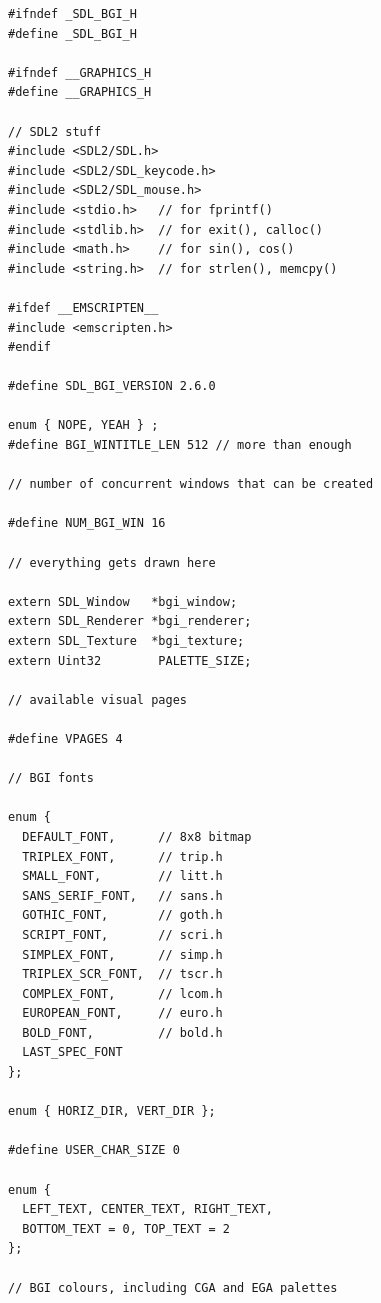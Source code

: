 \documentclass[a4paper,12pt]{article}
\begin{document}
\begin{small}
\begin{spacing}{0.85}
\begin{verbatim}
#ifndef _SDL_BGI_H
#define _SDL_BGI_H

#ifndef __GRAPHICS_H
#define __GRAPHICS_H

// SDL2 stuff
#include <SDL2/SDL.h>
#include <SDL2/SDL_keycode.h>
#include <SDL2/SDL_mouse.h>
#include <stdio.h>   // for fprintf()
#include <stdlib.h>  // for exit(), calloc()
#include <math.h>    // for sin(), cos()
#include <string.h>  // for strlen(), memcpy()

#ifdef __EMSCRIPTEN__
#include <emscripten.h>
#endif

#define SDL_BGI_VERSION 2.6.0

enum { NOPE, YEAH } ;
#define BGI_WINTITLE_LEN 512 // more than enough

// number of concurrent windows that can be created

#define NUM_BGI_WIN 16

// everything gets drawn here

extern SDL_Window   *bgi_window;
extern SDL_Renderer *bgi_renderer;
extern SDL_Texture  *bgi_texture;
extern Uint32        PALETTE_SIZE;

// available visual pages

#define VPAGES 4

// BGI fonts

enum {
  DEFAULT_FONT,      // 8x8 bitmap
  TRIPLEX_FONT,      // trip.h
  SMALL_FONT,        // litt.h
  SANS_SERIF_FONT,   // sans.h
  GOTHIC_FONT,       // goth.h
  SCRIPT_FONT,       // scri.h
  SIMPLEX_FONT,      // simp.h
  TRIPLEX_SCR_FONT,  // tscr.h
  COMPLEX_FONT,      // lcom.h
  EUROPEAN_FONT,     // euro.h
  BOLD_FONT,         // bold.h
  LAST_SPEC_FONT
};

enum { HORIZ_DIR, VERT_DIR };

#define USER_CHAR_SIZE 0

enum {
  LEFT_TEXT, CENTER_TEXT, RIGHT_TEXT,
  BOTTOM_TEXT = 0, TOP_TEXT = 2
};

// BGI colours, including CGA and EGA palettes


\end{verbatim}
\end{spacing}
\end{small}
\end{document}
